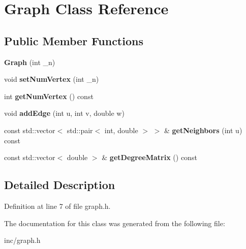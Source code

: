 \hypertarget{classGraph}{}\section{Graph Class Reference}
\label{classGraph}
\subsection*{Public Member Functions}
\begin{DoxyCompactItemize}
\item 
\mbox{\label{classGraph_a252af8157a85bbf4564ed11cb545e617}} 
{\bfseries Graph} (int \+\_\+n)
\item 
\mbox{\label{classGraph_ab3163e71e2273e5e2cf4f811f18e8158}} 
void {\bfseries set\+Num\+Vertex} (int \+\_\+n)
\item 
\mbox{\label{classGraph_abb5e0517e2979c54eebdafc2a9875e8f}} 
int {\bfseries get\+Num\+Vertex} () const
\item 
\mbox{\label{classGraph_abb506ed914992e475c398e35f4c31ec3}} 
void {\bfseries add\+Edge} (int u, int v, double w)
\item 
\mbox{\label{classGraph_a30eacf35eebb405380b60b3737c76f8f}} 
const std\+::vector$<$ std\+::pair$<$ int, double $>$ $>$ \& {\bfseries get\+Neighbors} (int u) const
\item 
\mbox{\label{classGraph_a56759aee6a32a47808c047716ca14efc}} 
const std\+::vector$<$ double $>$ \& {\bfseries get\+Degree\+Matrix} () const
\end{DoxyCompactItemize}


\subsection{Detailed Description}


Definition at line 7 of file graph.\+h.



The documentation for this class was generated from the following file\+:\begin{DoxyCompactItemize}
\item 
inc/graph.\+h\end{DoxyCompactItemize}
